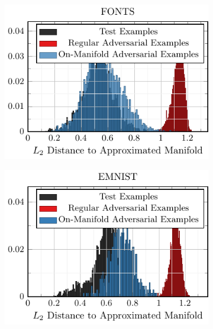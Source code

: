\begin{appendix}
\begin{figure}[t]
    \centering
    \vskip -0.4cm
    \begin{subfigure}[t]{0.32\textwidth}
        \centering
        \includegraphics[width=1\textwidth]{appendix_manifold_a.pdf}
    \end{subfigure}
    \begin{subfigure}[t]{0.32\textwidth}
        \centering
        \includegraphics[width=1\textwidth]{appendix_manifold_c.pdf}
    \end{subfigure}
    \begin{subfigure}[t]{0.32\textwidth}
        \centering

\end{subfigure}
\end{figure}
\end{appendix}
